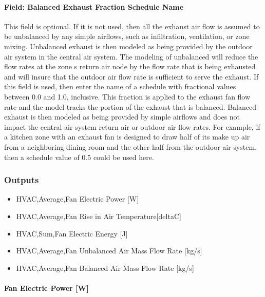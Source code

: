 \paragraph{Field: Balanced Exhaust Fraction Schedule Name}\label{field-balanced-exhaust-fraction-schedule-name}

This field is optional. If it is not used, then all the exhaust air flow is assumed to be unbalanced by any simple airflows, such as infiltration, ventilation, or zone mixing. Unbalanced exhaust is then modeled as being provided by the outdoor air system in the central air system. The modeling of unbalanced will reduce the flow rates at the zone s return air node by the flow rate that is being exhausted and will insure that the outdoor air flow rate is sufficient to serve the exhaust. If this field is used, then enter the name of a schedule with fractional values between 0.0 and 1.0, inclusive. This fraction is applied to the exhaust fan flow rate and the model tracks the portion of the exhaust that is balanced. Balanced exhaust is then modeled as being provided by simple airflows and does not impact the central air system return air or outdoor air flow rates. For example, if a kitchen zone with an exhaust fan is designed to draw half of its make up air from a neighboring dining room and the other half from the outdoor air system, then a schedule value of 0.5 could be used here.

\subsubsection{Outputs}\label{outputs-3-007}

\begin{itemize}
\item
  HVAC,Average,Fan Electric Power {[}W{]}
\item
  HVAC,Average,Fan Rise in Air Temperature{[}deltaC{]}
\item
  HVAC,Sum,Fan Electric Energy {[}J{]}
\item
  HVAC,Average,Fan Unbalanced Air Mass Flow Rate {[}kg/s{]}
\item
  HVAC,Average,Fan Balanced Air Mass Flow Rate {[}kg/s{]}
\end{itemize}

\paragraph{Fan Electric Power {[}W{]}}\label{fan-electric-power-w-3}

